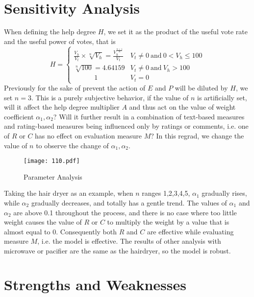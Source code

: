 \documentclass{mcmthesis}
\begin{document}
\section{Sensitivity Analysis}
When defining the help degree $ H $, we set it as the product of the useful vote rate and the useful power of votes, that is 
\begin{equation}
H=\left\{ \begin{array}{ll} 	\frac{V_h}{V_t}\times \sqrt[n]{V_h}=\frac{V_{h}^{\frac{n+1}{n}}}{V_t} & V_t\ne 0 \ \text{and} \ 0<V_h\le 100\\ 	\sqrt[n]{100}=4.64159 & V_t\ne 0 \ \text{and} \ V_h>100\\ \qquad\quad 1 & V_t=0 \end{array} \right.
\end{equation}
Previously for the sake of prevent the action of $ E $ and $ P $ will be diluted by $ H $, we set $ n=3 $. This is a purely subjective behavior, if the value of $ n $ is artificially set, will it affect the help degree multiplier $ A $ and thus act on the value of weight coefficient $ \alpha _1,\alpha _2 $? Will it further result in a combination of text-based measures and rating-based measures being influenced only by ratings or comments, i.e. one of $ R $ or $ C $ has no effect on evaluation measure $ M $? In this regrad, we change the value of $ n $ to observe the change of $ \alpha _1,\alpha _2 $.
\begin{figure}[h]
	\small
	\centering
	\texttt{[image: 110.pdf]}
	\caption{Parameter Analysis} \label{fig:ff}
\end{figure}
Taking the hair dryer as an example, when $ n $ ranges 1,2,3,4,5, $\alpha_1$ gradually rises, while $\alpha_2$ gradually decreases, and totally has a gentle trend. The values of $\alpha_1$ and $\alpha_2$ are above 0.1 throughout the process, and there is no case where too little weight causes the value of $R$ or $C$ to multiply the weight by a value that is almost equal to 0. Consequently both $R$ and $C$ are effective while evaluating measure $ M $, i.e. the model is effective. The results of other analysis with microwave or pacifier are the same as the hairdryer, so the model is robust.

\section{Strengths and Weaknesses}
\end{document}
